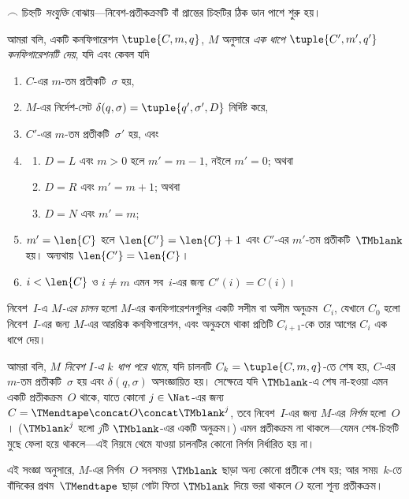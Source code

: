\documentclass[../../../include/open-logic-section]{subfiles}
\begin{document}
\begin{explain}
$\frown$ চিহ্নটি \emph{সংযুক্তি} বোঝায়—নিবেশ-প্রতীকক্রমটি বাঁ প্রান্তের
চিহ্নটির ঠিক ডান পাশে শুরু হয়।

\end{explain}

\begin{defn}
আমরা বলি, একটি কনফিগারেশন $\tuple{C, m, q}$, $M$ অনুসারে
\emph{এক ধাপে $\tuple{C', m', q'}$ কনফিগারেশনটি দেয়}, যদি এবং কেবল যদি
\begin{enumerate}
\item $C$-এর $m$-তম প্রতীকটি~$\sigma$ হয়,
\item $M$-এর নির্দেশ-সেট $\delta(q, \sigma) =
  \tuple{q', \sigma', D}$ নির্দিষ্ট করে,
\item $C'$-এর $m$-তম প্রতীকটি~$\sigma'$ হয়, এবং
\item
\begin{enumerate}
\item $D = L$ এবং $m>0$ হলে $m' = m - 1$, নইলে $m'=0$; অথবা
\item $D = R$ এবং $m' = m + 1$; অথবা
\item $D = N$ এবং $m' = m$;
\end{enumerate}
\item $m' = \len{C}$ হলে $\len{C'} = \len{C} + 1$ এবং $C'$-এর
  $m'$-তম প্রতীকটি~$\TMblank$ হয়। অন্যথায় $\len{C'}=\len{C}$।
\item $i < \len{C}$ ও $i \neq m$ এমন সব~$i$-এর জন্য $C'(i) = C(i)$।
\end{enumerate}
\end{defn}

\begin{defn}
নিবেশ~$I$-এ \emph{$M$-এর চালন} হলো $M$-এর কনফিগারেশনগুলির একটি সসীম
বা অসীম অনুক্রম~$C_i$, যেখানে $C_0$ হলো নিবেশ~$I$-এর জন্য $M$-এর
আরম্ভিক কনফিগারেশন, এবং অনুক্রমে থাকা প্রতিটি $C_{i+1}$-কে তার আগের
$C_i$ এক ধাপে দেয়।


আমরা বলি, $M$ \emph{নিবেশ $I$-এ $k$ ধাপ পরে থামে}, যদি চালনটি
$C_k = \tuple{C, m, q}$-তে শেষ হয়, $C$-এর $m$-তম প্রতীকটি~$\sigma$
হয় এবং $\delta(q, \sigma)$ অসংজ্ঞায়িত হয়। সেক্ষেত্রে যদি
$\TMblank$-এ শেষ না-হওয়া এমন একটি প্রতীকক্রম~$O$ থাকে, যাতে কোনো
$j \in \Nat$-এর জন্য
$C = \TMendtape \concat O \concat \TMblank^j$, তবে নিবেশ~$I$-এর জন্য
$M$-এর \emph{নির্গম} হলো~$O$। ($\TMblank^j$ হলো $j$টি
$\TMblank$-এর একটি অনুক্রম।) এমন প্রতীকক্রম না থাকলে—যেমন শেষ-চিহ্নটি মুছে
ফেলা হয়ে থাকলে—এই নিয়মে থেমে যাওয়া চালনটির কোনো নির্গম নির্ধারিত হয়
না।

\end{defn}

\begin{explain}
এই সংজ্ঞা অনুসারে, $M$-এর নির্গম~$O$ সবসময় $\TMblank$ ছাড়া অন্য কোনো
প্রতীকে শেষ হয়; আর সময়~$k$-তে বাঁদিকের প্রথম~$\TMendtape$ ছাড়া গোটা
ফিতা $\TMblank$ দিয়ে ভরা থাকলে $O$ হলো শূন্য প্রতীকক্রম।
\end{explain}
\end{document}
